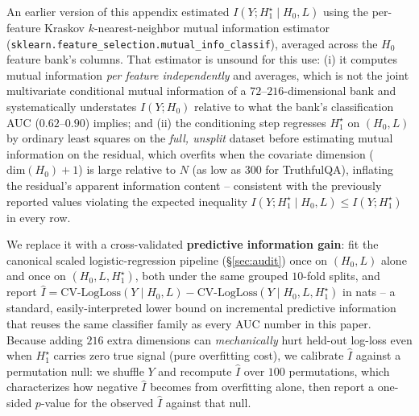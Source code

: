 \documentclass{article}
\begin{document}
An earlier version of this appendix estimated $I(Y; H_1^\star \mid H_0, L)$ using the per-feature Kraskov $k$-nearest-neighbor mutual information estimator (\texttt{sklearn.feature\_selection.mutual\_info\_classif}), averaged across the $H_0$ feature bank's columns. That estimator is unsound for this use: (i) it computes mutual information \emph{per feature independently} and averages, which is not the joint multivariate conditional mutual information of a $72$--$216$-dimensional bank and systematically understates $I(Y;H_0)$ relative to what the bank's classification AUC ($0.62$--$0.90$) implies; and (ii) the conditioning step regresses $H_1^\star$ on $(H_0, L)$ by ordinary least squares on the \emph{full, unsplit} dataset before estimating mutual information on the residual, which overfits when the covariate dimension ($\mathrm{dim}(H_0)+1$) is large relative to $N$ (as low as $300$ for TruthfulQA), inflating the residual's apparent information content -- consistent with the previously reported values violating the expected inequality $I(Y; H_1^\star \mid H_0, L) \le I(Y; H_1^\star)$ in every row.

We replace it with a cross-validated \textbf{predictive information gain}: fit the canonical scaled logistic-regression pipeline (\S\ref{sec:audit}) once on $(H_0, L)$ alone and once on $(H_0, L, H_1^\star)$, both under the same grouped $10$-fold splits, and report $\hat{I} = \text{CV-LogLoss}(Y \mid H_0, L) - \text{CV-LogLoss}(Y \mid H_0, L, H_1^\star)$ in nats -- a standard, easily-interpreted lower bound on incremental predictive information that reuses the same classifier family as every AUC number in this paper. Because adding $216$ extra dimensions can \emph{mechanically} hurt held-out log-loss even when $H_1^\star$ carries zero true signal (pure overfitting cost), we calibrate $\hat{I}$ against a permutation null: we shuffle $Y$ and recompute $\hat{I}$ over $100$ permutations, which characterizes how negative $\hat{I}$ becomes from overfitting alone, then report a one-sided $p$-value for the observed $\hat{I}$ against that null.
\end{document}
